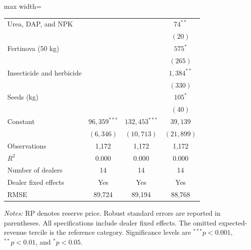 \documentclass[11pt]{article}
\begin{document}
\begin{table}[!htbp]
\begin{threeparttable}
\begin{adjustbox}{max width=\textwidth}
\begin{tabular}{lccc}
Urea, DAP, and NPK
    & & & $74^{**}$ \\
    & & & $(20)$ \\

Fertinova (50 kg)
    & & & $575^{*}$ \\
    & & & $(265)$ \\

Insecticide and herbicide
    & & & $1{,}384^{**}$ \\
    & & & $(330)$ \\

Seeds (kg)
    & & & $105^{*}$ \\
    & & & $(40)$ \\

\addlinespace
Constant
    & $96{,}359^{***}$
    & $132{,}453^{***}$
    & $39{,}139$ \\
    & $(6{,}346)$
    & $(10{,}713)$
    & $(21{,}899)$ \\

\midrule
Observations
    & 1,172 & 1,172 & 1,172 \\
$R^{2}$
    & 0.000 & 0.000 & 0.000 \\
Number of dealers
    & 14 & 14 & 14 \\
Dealer fixed effects
    & Yes & Yes & Yes \\
RMSE
    & 89,724 & 89,194 & 88,768 \\
\bottomrule
\end{tabular}
\end{adjustbox}

\begin{tablenotes}[flushleft]
\footnotesize
\item \textit{Notes:} RP denotes reserve price. Robust standard errors are
reported in parentheses. All specifications include dealer fixed effects.
The omitted expected-revenue tercile is the reference category.
Significance levels are $^{***}p<0.001$, $^{**}p<0.01$, and $^{*}p<0.05$.
\end{tablenotes}

\end{threeparttable}
\end{table}
\end{document}
